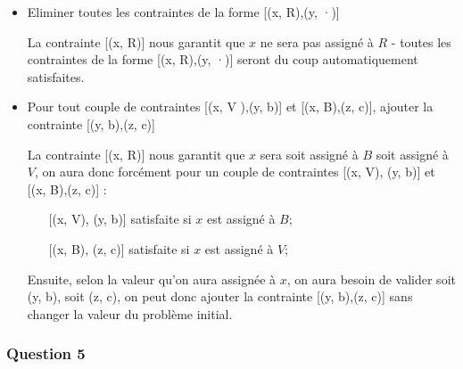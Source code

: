\documentclass{report}
\begin{document}
\begin{itemize}
\item Eliminer toutes les contraintes de la forme [(x, R),(y, ·)]

La contrainte [(x, R)] nous garantit que $x$ ne sera pas assigné à $R$ - toutes les contraintes de la forme [(x, R),(y, ·)] seront du coup automatiquement satisfaites.

\item Pour tout couple de contraintes [(x, V ),(y, b)] et [(x, B),(z, c)], ajouter la contrainte [(y, b),(z, c)]

  La contrainte [(x, R)] nous garantit que $x$ sera soit assigné à $B$ soit assigné à $V$, on aura donc forcément pour un couple de contraintes [(x, V), (y, b)] et [(x, B),(z, c)] :
  \begin{itemize}
  \item[] [(x, V), (y, b)] satisfaite si $x$ est assigné à $B$;
  \item[] [(x, B), (z, c)] satisfaite si $x$ est assigné à $V$;
  \end{itemize}    
    
Ensuite, selon la valeur qu'on aura assignée à $x$, on aura besoin de valider soit (y, b), soit (z, c), on peut donc ajouter la contrainte [(y, b),(z, c)] sans changer la valeur du problème initial. 
\end{itemize}

\subsubsection*{Question 5}
\end{document}

